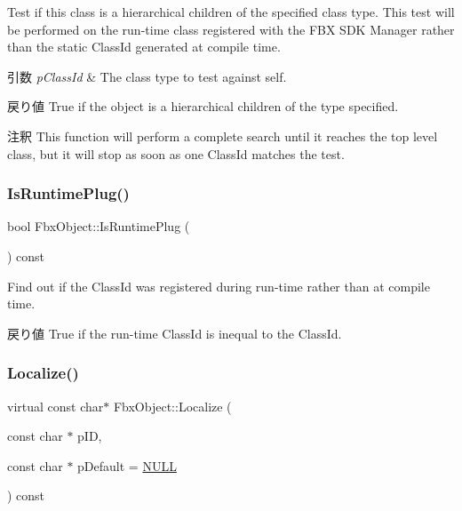 Test if this class is a hierarchical children of the specified class type. This test will be performed on the run-\/time class registered with the F\+BX S\+DK Manager rather than the static Class\+Id generated at compile time. 
\begin{DoxyParams}{引数}
{\em p\+Class\+Id} & The class type to test against self. \\
\hline
\end{DoxyParams}
\begin{DoxyReturn}{戻り値}
True if the object is a hierarchical children of the type specified. 
\end{DoxyReturn}
\begin{DoxyRemark}{注釈}
This function will perform a complete search until it reaches the top level class, but it will stop as soon as one Class\+Id matches the test. 
\end{DoxyRemark}
\mbox{\label{class_fbx_object_a4c804ecb85faa0544d305d9f7e98d777}} 
\subsubsection{\texorpdfstring{Is\+Runtime\+Plug()}{IsRuntimePlug()}}
{\footnotesize\ttfamily bool Fbx\+Object\+::\+Is\+Runtime\+Plug (\begin{DoxyParamCaption}{ }\end{DoxyParamCaption}) const}

Find out if the Class\+Id was registered during run-\/time rather than at compile time. \begin{DoxyReturn}{戻り値}
True if the run-\/time Class\+Id is inequal to the Class\+Id. 
\end{DoxyReturn}
\mbox{\label{class_fbx_object_a9b8ae43ccdd09be07b450e0ed54788ab}} 
\subsubsection{\texorpdfstring{Localize()}{Localize()}}
{\footnotesize\ttfamily virtual const char$\ast$ Fbx\+Object\+::\+Localize (\begin{DoxyParamCaption}\item[{const char $\ast$}]{p\+ID,  }\item[{const char $\ast$}]{p\+Default = {\ttfamily \hyperlink{fbxarch_8h_a070d2ce7b6bb7e5c05602aa8c308d0c4}{N\+U\+LL}} }\end{DoxyParamCaption}) const\hspace{0.3cm}{\ttfamily [virtual]}}


